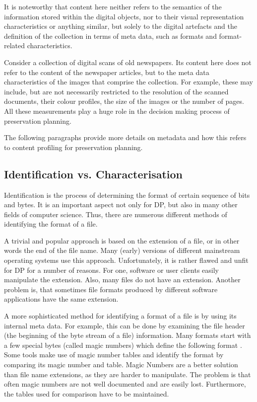 It is noteworthy that content here neither refers to the semantics of the information stored within the digital objects, nor to their visual representation characteristics or anything similar, but solely to the digital artefacts and the definition of the collection in terms of meta data, such as formats and format-related characteristics.

Consider a collection of digital scans of old newspapers. Its content here does not refer to the content of the newspaper articles, but to the meta data characteristics of the images that comprise the collection. For example, these may include, but are not necessarily restricted to the resolution of the scanned documents, their colour profiles, the size of the images or the number of pages. All these measurements play a huge role in the decision making process of preservation planning.

The following paragraphs provide more details on metadata and how this refers to content profiling for preservation planning.

\subsection{Identification vs. Characterisation}
Identification is the process of determining the format of certain sequence of bits and bytes. It is an important aspect not only for DP, but also in many other fields of computer science. Thus, there are numerous different methods of identifying the format of a file.

A trivial and popular approach is based on the extension of a file, or in other words the end of the file name. Many (early) versions of different mainstream operating systems use this approach. Unfortunately, it is rather flawed and unfit for DP for a number of reasons. For one, software or user clients easily manipulate the extension. Also, many files do not have an extension. Another problem is, that sometimes file formats produced by different software applications have the same extension.

A more sophisticated method for identifying a format of a file is by using its internal meta data. For example, this can be done by examining the file header (the beginning of the byte stream of a file) information. Many formats start with a few special bytes (called magic numbers) which define the following format \cite{linfoproject:magicnumbers}. Some tools make use of magic number tables and identify the format by comparing its magic number and table. Magic Numbers are a better solution than file name extensions, as they are harder to manipulate. The problem is that often magic numbers are not well documented and are easily lost. Furthermore, the tables used for comparison have to be maintained.

